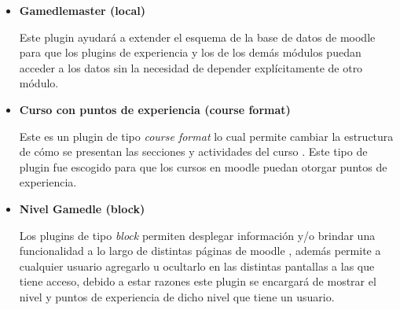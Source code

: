     \begin{itemize}
    \item {\bf\color{primary}%
    \hypertarget{local:gamedlemaster}{Gamedlemaster} (local)}

        Este plugin ayudará a extender el esquema de la base de datos de moodle
        para que los plugins de experiencia y los de los demás módulos puedan
        acceder a los datos sin la necesidad de depender explícitamente de otro
        módulo.

    \item {\bf\color{primary}%
    \hypertarget{format:gamedle}{Curso con puntos de experiencia} (course format)}

        Este es un plugin de tipo {\it course format} lo cual permite cambiar
        la estructura de cómo se presentan las secciones y actividades del curso
        \cite{MoodleCourseFormat}. Este tipo de plugin fue escogido para que los
        cursos en moodle puedan otorgar puntos de experiencia.

    \item {\bf\color{primary}%
    \hypertarget{block:gmxp}{Nivel Gamedle} (block)}

        Los plugins de tipo {\it block} permiten desplegar información y/o brindar una 
        funcionalidad a lo largo de distintas páginas de moodle \cite{MoodleBlocks},
        además permite a cualquier usuario agregarlo u ocultarlo en las distintas
        pantallas a las que tiene acceso, debido a estar razones este plugin se
        encargará de mostrar el nivel y puntos de experiencia de dicho nivel que
        tiene un usuario.
    \end{itemize}


